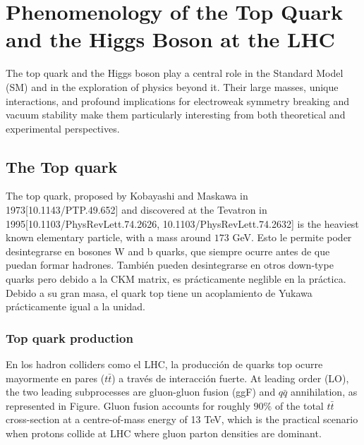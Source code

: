 \documentclass[11pt,twoside]{book}
\begin{document}
\section{Phenomenology of the Top Quark and the Higgs Boson at the LHC}
\label{sec:top_higgs_lhc}
The top quark and the Higgs boson play a central role in the Standard Model (\acrshort{SM}) and in the exploration of physics beyond it. Their large masses, unique interactions, and profound implications for electroweak symmetry breaking and vacuum stability make them particularly interesting from both theoretical and experimental perspectives. 

\subsection{The Top quark}
\label{sec:top_quark}

The top quark, proposed by Kobayashi and Maskawa in 1973[10.1143/PTP.49.652] and discovered at the Tevatron in 1995[10.1103/PhysRevLett.74.2626, 10.1103/PhysRevLett.74.2632] is the heaviest known elementary particle, with a mass around $173$ GeV. Esto le permite poder desintegrarse en bosones W and b quarks, que siempre ocurre antes de que puedan formar hadrones. También pueden desintegrarse en otros down-type quarks pero debido a la CKM matrix, es prácticamente neglible en la práctica. Debido a su gran masa, el quark top tiene un acoplamiento de Yukawa prácticamente igual a la unidad. 

\subsubsection*{Top quark production}
\label{subsec:top_quark_prod}

En los hadron colliders como el LHC, la producción de quarks top ocurre mayormente en pares ($t\bar{t}$) a través de interacción fuerte. At leading order (LO), the two leading subprocesses are gluon-gluon fusion (ggF) and $q\bar{q}$ annihilation, as represented in Figure. Gluon fusion accounts for roughly $90\%$ of the total $t\bar{t}$ cross-section at a centre-of-mass energy of 13 TeV, which is the practical scenario when protons collide at LHC where gluon parton densities are dominant. 
\end{document}
